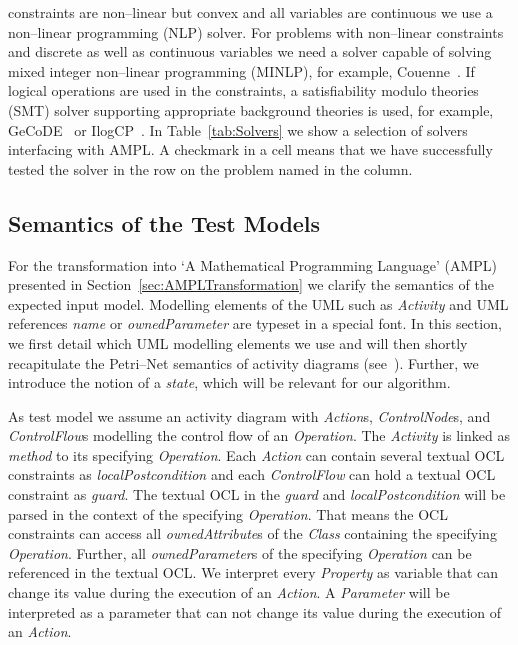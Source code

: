 \documentclass[runningheads,a4paper]{llncs}%
\newcommand{\UMLType}[1]{\textsf{\textit{#1}}} %
\newcommand{\UMLReference}[1]{\textsf{\textit{#1}}} %
\begin{document}
constraints are non--linear but convex and all variables are continuous we use a
non--linear programming (NLP) solver. For problems with non--linear constraints
and discrete as well as continuous variables we need a solver capable of solving
mixed integer non--linear programming (MINLP), for example,
Couenne~\cite{Belotti09couenne}. If logical operations are used in the
constraints, a satisfiability modulo theories (SMT) solver supporting
appropriate background theories is used, for example, GeCoDE~\cite{gecode} or
IlogCP~\cite{ilogcp}. In Table~\ref{tab:Solvers} we show a selection of solvers
interfacing with AMPL. A checkmark in a cell means that we have successfully
tested the solver in the row on the problem named in the column.%
\subsection{Semantics of the Test Models}%
\label{sec:TestModel}%
For the transformation into `A Mathematical Programming Language' (AMPL)
presented in Section~\ref{sec:AMPLTransformation} we clarify the semantics of
the expected input model. Modelling elements of the UML such as
\UMLType{Activity} and UML references \UMLReference{name} or
\UMLReference{ownedParameter} are typeset in a special font. In this section, we
first detail which UML modelling elements we use and will then shortly
recapitulate the Petri--Net semantics of activity diagrams
(see~\cite{UML23Superstructure}). Further, we introduce the notion of a
\emph{state}, which will be relevant for our algorithm.

As test model we assume an activity diagram with \UMLType{Action}s,
\UMLType{ControlNode}s, and \UMLType{ControlFlow}s modelling the control flow of
an \UMLType{Operation}. The \UMLType{Activity} is linked as
\UMLReference{method} to its specifying \UMLType{Operation}. Each
\UMLType{Action} can contain several textual OCL constraints as
\UMLReference{localPostcondition} and each \UMLType{ControlFlow} can hold a
textual OCL constraint as \UMLReference{guard}. The textual OCL in the
\UMLReference{guard} and \UMLReference{localPostcondition} will be parsed in the
context of the specifying \UMLType{Operation}. That means the OCL constraints
can access all \UMLReference{ownedAttribute}s of the \UMLType{Class} containing
the specifying \UMLType{Operation}. Further, all \UMLReference{ownedParameter}s
of the specifying \UMLType{Operation} can be referenced in the textual OCL. We
interpret every \UMLType{Property} as variable that can change its value during
the execution of an \UMLType{Action}. A \UMLType{Parameter} will be interpreted
as a parameter that can not change its value during the execution of an
\UMLType{Action}.
\end{document}
